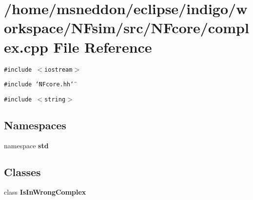 \section{/home/msneddon/eclipse/indigo/workspace/NFsim/src/NFcore/complex.cpp File Reference}
\label{complex_8cpp}


{\tt \#include $<$iostream$>$}\par
{\tt \#include \char`\"{}NFcore.hh\char`\"{}}\par
{\tt \#include $<$string$>$}\par
\subsection*{Namespaces}
\begin{CompactItemize}
\item 
namespace {\bf std}
\end{CompactItemize}
\subsection*{Classes}
\begin{CompactItemize}
\item 
class {\bf IsInWrongComplex}
\end{CompactItemize}
